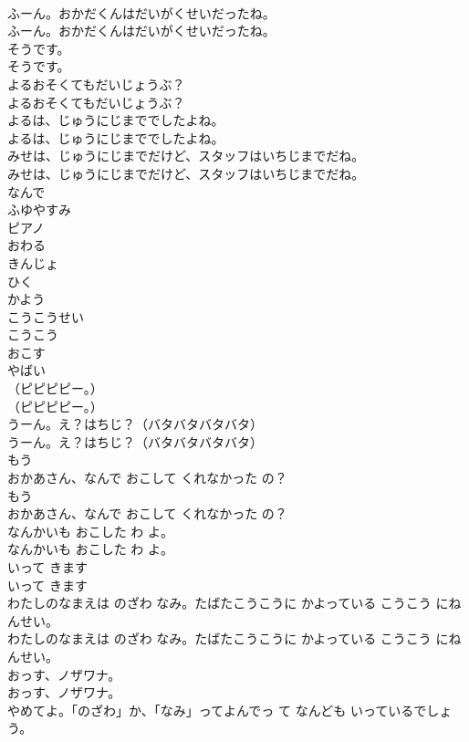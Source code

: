 \documentclass[8pt]{extreport}
\begin{document}
\begin{CJK}{UTF8}{min}
\\	ふーん。おかだくんはだいがくせいだったね。
\\	ふーん。おかだくんはだいがくせいだったね。
\\	そうです。
\\	そうです。
\\	よるおそくてもだいじょうぶ？
\\	よるおそくてもだいじょうぶ？
\\	よるは、じゅうにじまででしたよね。
\\	よるは、じゅうにじまででしたよね。
\\	みせは、じゅうにじまでだけど、スタッフはいちじまでだね。
\\	みせは、じゅうにじまでだけど、スタッフはいちじまでだね。
\\	なんで
\\	ふゆやすみ
\\	ピアノ
\\	おわる
\\	きんじょ
\\	ひく
\\	かよう
\\	こうこうせい
\\	こうこう
\\	おこす
\\	やばい
\\	（ピピピピー。）
\\	（ピピピピー。）
\\	うーん。え？はちじ？（バタバタバタバタ）
\\	うーん。え？はちじ？（バタバタバタバタ）
\\	もう
\\	おかあさん、なんで おこして くれなかった の？
\\	もう
\\	おかあさん、なんで おこして くれなかった の？
\\	なんかいも おこした わ よ。
\\	なんかいも おこした わ よ。
\\	いって きます
\\	いって きます
\\	わたしのなまえは のざわ なみ。たばたこうこうに かよっている こうこう にねんせい。
\\	わたしのなまえは のざわ なみ。たばたこうこうに かよっている こうこう にねんせい。
\\	おっす、ノザワナ。
\\	おっす、ノザワナ。
\\	やめてよ。「のざわ」か、「なみ」ってよんでっ て なんども いっているでしょう。

\end{CJK}
\end{document}
